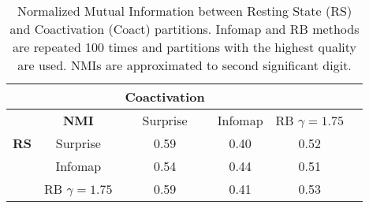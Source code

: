\begin{table}
\centering
\begin{tabular}{lccccc}
& &\textbf{Coactivation}	&	&	&\\
\hline
&\textbf{NMI}&	Surprise &	Infomap&	RB $\gamma=1.75$\\ \hline
\textbf{RS} &Surprise& 0.59&0.40&0.52\\
	&Infomap & 0.54&0.44&0.51\\
	&RB $\gamma=1.75$ &0.59&0.41&0.53\\ \hline 
\end{tabular}
\caption{Normalized Mutual Information between Resting State (RS) and Coactivation (Coact) partitions. Infomap and RB methods are repeated 100 times and partitions with the highest quality are used. NMIs are approximated to second significant digit.}
\end{table}